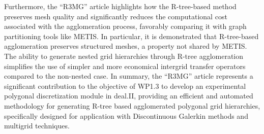 \documentclass[a4paper,12pt]{article}
\begin{document}
Furthermore, the ``R3MG'' article highlights how the R-tree-based method preserves
mesh quality and significantly reduces the computational cost associated with
the agglomeration process, favorably comparing it with graph partitioning tools
like METIS. In particular, it is demonstrated that R-tree-based agglomeration
preserves structured meshes, a property not shared by METIS. The ability to
generate nested grid hierarchies through R-tree agglomeration simplifies the use
of simpler and more economical intergrid transfer operators compared to the
non-nested case. In summary, the ``R3MG'' article represents a significant
contribution to the objective of WP1.3 to develop an experimental polygonal
discretization module in deal.II, providing an efficient and automated
methodology for generating R-tree based agglomerated polygonal grid hierarchies,
specifically designed for application with Discontinuous Galerkin methods and
multigrid techniques.
\end{document}
